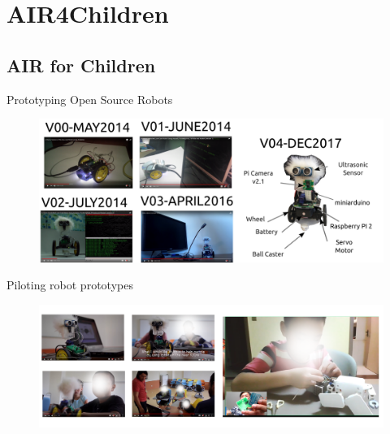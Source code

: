 \section{AIR4Children}

\subsection{AIR for Children}

{
\begin{frame}{Prototyping Open Source Robots}
      \begin{figure}
        \centering
        \includegraphics[width=1.0\textwidth]{./figures/air4children/versions/drawing-v00.png}
      \end{figure}
\end{frame}
}

{
\begin{frame}{Piloting robot prototypes}
      \begin{figure}
        \centering
        \includegraphics[width=1.0\textwidth]{./figures/air4children/versions/drawing-v01.png}
      \end{figure}
\end{frame}
}

